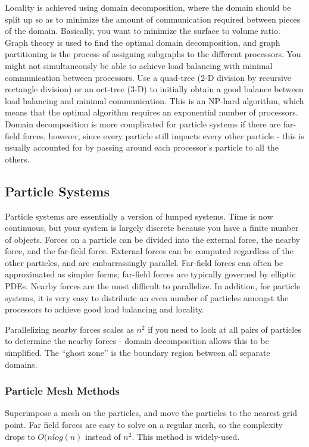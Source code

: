 \documentclass[10pt]{article}
\begin{document}
\begin{flushleft}
Locality is achieved using domain decomposition, where the domain should be split up so as to minimize the amount of communication required between pieces of the domain. Basically, you want to minimize the surface to volume ratio. Graph theory is used to find the optimal domain decomposition, and graph partitioning is the process of assigning subgraphs to the different processors. You might not simultaneously be able to achieve load balancing with minimal communication between processors. Use a quad-tree (2-D division by recursive rectangle division) or an oct-tree (3-D) to initially obtain a good balance between load balancing and minimal communication. This is an NP-hard algorithm, which means that the optimal algorithm requires an exponential number of processors. Domain decomposition is more complicated for particle systems if there are far-field forces, however, since every particle still impacts every other particle - this is usually accounted for by passing around each processor's particle to all the others. 

\subsection{Particle Systems}

Particle systems are essentially a version of lumped systems. Time is now continuous, but your system is largely discrete because you have a finite number of objects. Forces on a particle can be divided into the external force, the nearby force, and the far-field force. External forces can be computed regardless of the other particles, and are embarrassingly parallel. Far-field forces can often be approximated as simpler forms; far-field forces are typically governed by elliptic PDEs. Nearby forces are the most difficult to parallelize. In addition, for particle systems, it is very easy to distribute an even number of particles amongst the processors to achieve good load balancing and locality.

Parallelizing nearby forces scales as \(n^2\) if you need to look at all pairs of particles to determine the nearby forces - domain decomposition allows this to be simplified. The ``ghost zone'' is the boundary region between all separate domains. 

\subsubsection{Particle Mesh Methods}

Superimpose a mesh on the particles, and move the particles to the nearest grid point. Far field forces are easy to solve on a regular mesh, so the complexity drops to \(O(nlog(n)\) instead of \(n^2\). This method is widely-used.


\end{flushleft}
\end{document}
